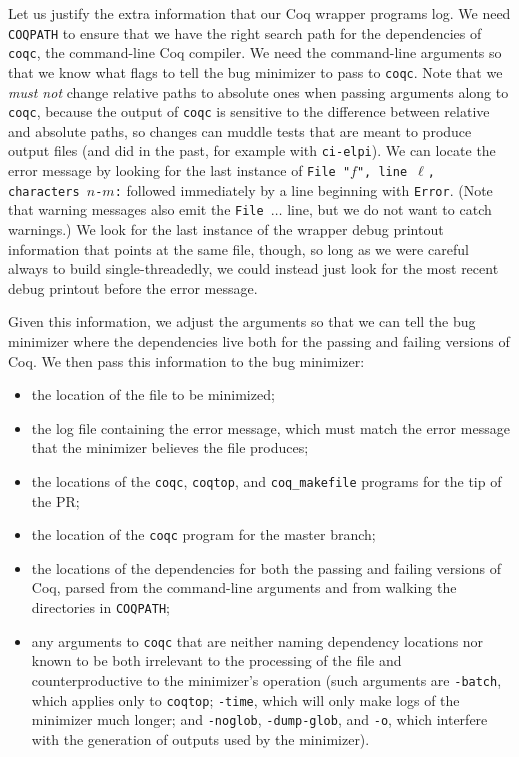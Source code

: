 \documentclass[a4paper,USenglish,cleveref,autoref,thm-restate]{lipics-v2021}
\begin{document}
Let us justify the extra information that our Coq wrapper programs log.
We need \texttt{COQPATH} to ensure that we have the right search path for the dependencies of \texttt{coqc}, the command-line Coq compiler.
We need the command-line arguments so that we know what flags to tell the bug minimizer to pass to \texttt{coqc}.
Note that we \emph{must not} change relative paths to absolute ones when passing arguments along to \texttt{coqc}, because the output of \texttt{coqc} is sensitive to the difference between relative and absolute paths, so changes can muddle tests that are meant to produce output files (and did in the past, for example with \texttt{ci-elpi}).
We can locate the error message by looking for the last instance of \texttt{File "$f$", line $\ell$, characters $n$-$m$:} followed immediately by a line beginning with \texttt{Error}.
(Note that warning messages also emit the \texttt{File $\ldots$} line, but we do not want to catch warnings.)
We look for the last instance of the wrapper debug printout information that points at the same file, though, so long as we were careful always to build single-threadedly, we could instead just look for the most recent debug printout before the error message.

Given this information, we adjust the arguments so that we can tell the bug minimizer where the dependencies live both for the passing and failing versions of Coq.
We then pass this information to the bug minimizer:
\begin{itemize}
\item the location of the file to be minimized;
\item the log file containing the error message, which must match the error message that the minimizer believes the file produces;
\item the locations of the \verb|coqc|, \verb|coqtop|, and \verb|coq_makefile| programs for the tip of the PR;
\item the location of the \verb|coqc| program for the master branch;
\item the locations of the dependencies for both the passing and failing versions of Coq, parsed from the command-line arguments and from walking the directories in \texttt{COQPATH};
\item any arguments to \verb|coqc| that are neither naming dependency locations nor known to be both irrelevant to the processing of the file and counterproductive to the minimizer's operation (such arguments are \verb|-batch|, which applies only to \verb|coqtop|; \verb|-time|, which will only make logs of the minimizer much longer; and \verb|-noglob|, \verb|-dump-glob|, and \verb|-o|, which interfere with the generation of outputs used by the minimizer).
\end{itemize}
\end{document}
